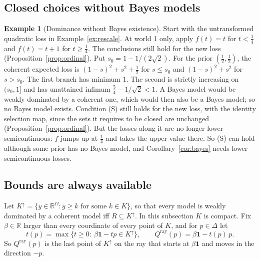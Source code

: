 \documentclass[11pt]{article}
\theoremstyle{definition}
\newtheorem{example}[theorem]{Example}
\theoremstyle{remark}
\newcommand{\R}{\mathbb R}
\newcommand{\one}{\mathbf 1}
\begin{document}
\subsection{Closed choices without Bayes models}
\begin{example}[Dominance without Bayes existence]\label{ex:discontinuous}
Start with the untransformed quadratic loss in Example~\ref{ex:rescale}.  At world 1 only, apply $f(t)=t$ for $t<\tfrac14$ and $f(t)=t+1$ for $t\ge\tfrac14$. The conclusions still hold for the new loss (Proposition~\ref{prop:ordinal}). Put $s_0=1-1/(2\sqrt2)$. For the prior $(\tfrac12,\tfrac12)$, the coherent expected loss is $(1-s)^2+s^2+\tfrac12$ for $s\le s_0$ and $(1-s)^2+s^2$ for $s>s_0$. The first branch has minimum $1$. The second is strictly increasing on $(s_0,1]$ and has unattained infimum $\tfrac54-1/\sqrt2<1$. A Bayes model would be weakly dominated by a coherent one, which would then also be a Bayes model; so no Bayes model exists. Condition (S) still holds for the new loss, with the identity selection map, since the sets it requires to be closed are unchanged (Proposition~\ref{prop:ordinal}). But the losses along it are no longer lower semicontinuous: $f$ jumps up at $\tfrac14$ and takes the upper value there. So (S) can hold although some prior has no Bayes model, and Corollary~\ref{cor:bayes} needs lower semicontinuous losses.
\end{example}

\subsection{Bounds are always available}\label{sec:necessary}
Let $K^\uparrow=\{y\in\R^\Omega:y\ge k\text{ for some }k\in K\}$, so that every model is weakly dominated by a coherent model iff $R\subseteq K^\uparrow$. In this subsection $K$ is compact. Fix $\beta\in\R$ larger than every coordinate of every point of $K$, and for $p\in\Delta$ let
\[
 t(p)=\max\{t\ge0:\ \beta\one-tp\in K^\uparrow\},\qquad Q^{\mathrm{ray}}(p)=\beta\one-t(p)\,p.
\]
So $Q^{\mathrm{ray}}(p)$ is the last point of $K^\uparrow$ on the ray that starts at $\beta\one$ and moves in the direction $-p$.
\end{document}
